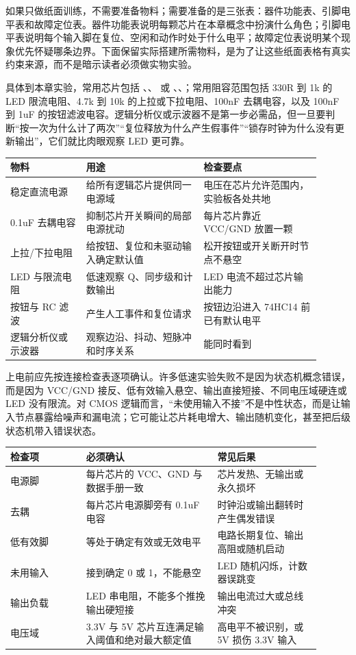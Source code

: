 如果只做纸面训练，不需要准备物料；需要准备的是三张表：器件功能表、引脚电平表和故障定位表。器件功能表说明每颗芯片在本章概念中扮演什么角色；引脚电平表说明每个输入脚在复位、空闲和动作时处于什么电平；故障定位表说明某个现象优先怀疑哪条边界。下面保留实际搭建所需物料，是为了让这些纸面表格有真实约束来源，而不是暗示读者必须做实物实验。

具体到本章实验，常用芯片包括 、、 或 、、；常用阻容范围包括 330R 到 1k 的 LED 限流电阻、4.7k 到 10k 的上拉或下拉电阻、100nF 去耦电容，以及 100nF 到 1uF 的按钮滤波电容。逻辑分析仪或示波器不是第一步必需品，但一旦要判断“按一次为什么计了两次”“复位释放为什么产生假事件”“锁存时钟为什么没有更新输出”，它们就比肉眼观察 LED 更可靠。

\begin{longtable}{L{0.22\linewidth}L{0.34\linewidth}L{0.34\linewidth}}
\toprule
物料 & 用途 & 检查要点 \\
\midrule
稳定直流电源 & 给所有逻辑芯片提供同一电源域 & 电压在芯片允许范围内，实验板各处共地 \\\tablerowrule
0.1uF 去耦电容 & 抑制芯片开关瞬间的局部电源扰动 & 每片芯片靠近 VCC/GND 放置一颗 \\\tablerowrule
上拉/下拉电阻 & 给按钮、复位和未驱动输入确定默认值 & 松开按钮或开关断开时节点不悬空 \\\tablerowrule
LED 与限流电阻 & 低速观察 Q、同步级和计数输出 & LED 电流不超过芯片输出能力 \\\tablerowrule
按钮与 RC 滤波 & 产生人工事件和复位请求 & 按钮边沿进入 74HC14 前已有默认电平 \\\tablerowrule
逻辑分析仪或示波器 & 观察边沿、抖动、短脉冲和时序关系 & 能同时看到  \\
\bottomrule
\end{longtable}

上电前应先按连接检查表逐项确认。许多低速实验失败不是因为状态机概念错误，而是因为 VCC/GND 接反、低有效输入悬空、输出直接短接、不同电压域硬连或 LED 没有限流。对 CMOS 逻辑而言，“未使用输入不接”不是中性状态，而是让输入节点暴露给噪声和漏电流；它可能让芯片耗电增大、输出随机变化，甚至把后级状态机带入错误状态。

\begin{longtable}{L{0.22\linewidth}L{0.38\linewidth}L{0.3\linewidth}}
\toprule
检查项 & 必须确认 & 常见后果 \\
\midrule
电源脚 & 每片芯片的 VCC、GND 与数据手册一致 & 芯片发热、无输出或永久损坏 \\\tablerowrule
去耦 & 每片芯片电源脚旁有 0.1uF 电容 & 时钟沿或输出翻转时产生偶发错误 \\\tablerowrule
低有效脚 &  等处于确定有效或无效电平 & 电路长期复位、输出高阻或随机启动 \\\tablerowrule
未用输入 & 接到确定 0 或 1，不能悬空 & LED 随机闪烁，计数器误跳变 \\\tablerowrule
输出负载 & LED 串电阻，不能多个推挽输出硬短接 & 输出电流过大或总线冲突 \\\tablerowrule
电压域 & 3.3V 与 5V 芯片互连满足输入阈值和绝对最大额定值 & 高电平不被识别，或 5V 损伤 3.3V 输入 \\
\bottomrule
\end{longtable}

